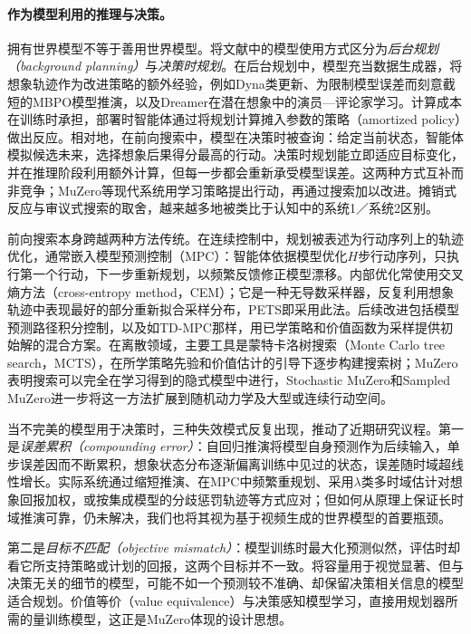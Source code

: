 \paragraph{作为模型利用的推理与决策。}
拥有世界模型不等于善用世界模型。\citet{sutton2018rl}将文献中的模型使用方式区分为\emph{后台规划（background planning）}与\emph{决策时规划}。在后台规划中，模型充当数据生成器，将想象轨迹作为改进策略的额外经验，例如Dyna类更新\citep{sutton1991dyna}、为限制模型误差而刻意截短的MBPO模型推演\citep{janner2019mbpo}，以及Dreamer在潜在想象中的演员—评论家学习\citep{hafner2019dreamer}。计算成本在训练时承担，部署时智能体通过将规划计算摊入参数的策略（amortized policy）做出反应。相对地，在前向搜索中，模型在决策时被查询：给定当前状态，智能体模拟候选未来，选择想象后果得分最高的行动。决策时规划能立即适应目标变化，并在推理阶段利用额外计算，但每一步都会重新承受模型误差。这两种方式互补而非竞争；MuZero等现代系统用学习策略提出行动，再通过搜索加以改进。摊销式反应与审议式搜索的取舍，越来越多地被类比于认知中的系统1／系统2区别\citep{kahneman2011thinking}。

前向搜索本身跨越两种方法传统。在连续控制中，规划被表述为行动序列上的轨迹优化，通常嵌入模型预测控制（MPC）：智能体依据模型优化$H$步行动序列，只执行第一个行动，下一步重新规划，以频繁反馈修正模型漂移。内部优化常使用交叉熵方法（cross-entropy method，CEM）；它是一种无导数采样器，反复利用想象轨迹中表现最好的部分重新拟合采样分布，PETS即采用此法\citep{chua2018pets}。后续改进包括模型预测路径积分控制\citep{williams2017mppi}，以及如TD-MPC那样，用已学策略和价值函数为采样提供初始解的混合方案\citep{hansen2022tdmpc}。在离散领域，主要工具是蒙特卡洛树搜索（Monte Carlo tree search，MCTS），在所学策略先验和价值估计的引导下逐步构建搜索树\citep{silver2016alphago,silver2017alphagozero}；MuZero表明搜索可以完全在学习得到的隐式模型中进行，Stochastic MuZero和Sampled MuZero进一步将这一方法扩展到随机动力学及大型或连续行动空间\citep{antonoglou2022stochasticmuzero,hubert2021sampledmuzero}。

当不完美的模型用于决策时，三种失效模式反复出现，推动了近期研究议程。第一是\emph{误差累积（compounding error）}：自回归推演将模型自身预测作为后续输入，单步误差因而不断累积，想象状态分布逐渐偏离训练中见过的状态，误差随时域超线性增长\citep{talvitie2017selfcorrecting,lambert2022compounding}。实际系统通过缩短推演\citep{janner2019mbpo}、在MPC中频繁重规划、采用$\lambda$类多时域估计对想象回报加权，或按集成模型的分歧惩罚轨迹等方式应对；但如何从原理上保证长时域推演可靠，仍未解决，我们也将其视为基于视频生成的世界模型的首要瓶颈。

第二是\emph{目标不匹配（objective mismatch）}：模型训练时最大化预测似然，评估时却看它所支持策略或计划的回报，这两个目标并不一致。将容量用于视觉显著、但与决策无关的细节的模型，可能不如一个预测较不准确、却保留决策相关信息的模型适合规划\citep{lambert2020objectivemismatch}。价值等价（value equivalence）与决策感知模型学习\citep{grimm2020valueequivalence,farahmand2017vaml}，直接用规划器所需的量训练模型，这正是MuZero体现的设计思想。

